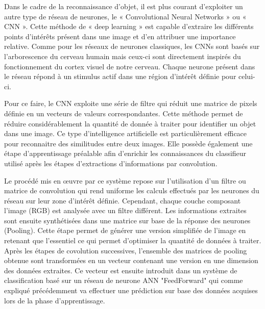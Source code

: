 \documentclass[a4paper,12pt]{article} %
\begin{document}
\newpage
\par
Dans le cadre de la reconnaissance d’objet, il est plus courant d’exploiter un autre type de réseau de neurones, le « Convolutional Neural Networks » ou « CNN ». Cette méthode de « deep learning » est capable d’extraire les différents points d’intérêts présent dans une image et d’en attribuer une importance relative. 
Comme pour les réseaux de neurones classiques, les CNNs sont basés sur l’arborescence du cerveau humain mais ceux-ci sont directement inspirés du fonctionnement du cortex visuel de notre cerveau. Chaque neurone présent dans le réseau répond à un stimulus actif dans une région d’intérêt définie pour celui-ci. \newline
\par
	Pour ce faire, le CNN exploite une série de filtre qui réduit une matrice de pixels définie en un vecteurs de valeurs correspondantes. Cette méthode permet de réduire considérablement la quantité de donnée à traiter pour identifier un objet dans une image. Ce type d’intelligence artificielle est particulièrement efficace pour reconnaitre des similitudes entre deux images. Elle possède également une étape d’apprentissage préalable afin d’enrichir les connaissances du classifieur utilisé après les étapes d’extractions d’informations par convolution. \newline
\par
Le procédé mis en œuvre par ce système repose sur l’utilisation d’un filtre ou matrice de convolution qui rend uniforme les calculs effectués par les neurones du réseau sur leur zone d’intérêt définie. Cependant, chaque couche composant l’image (RGB) est analysée avec un filtre différent. Les informations extraites sont ensuite synthétisées dans une matrice sur base de la réponse des neurones (Pooling). Cette étape permet de générer une version simplifiée de l’image en retenant que l’essentiel ce qui permet d’optimiser la quantité de données à traiter. Après les étapes de covolution successives, l’ensemble des matrices de pooling obtenue sont transformées en un vecteur contenant une version en une dimension des données extraites. Ce vecteur est ensuite introduit dans un système de classification basé sur un réseau de neurone ANN "FeedForward" qui comme expliqué précédemment va effectuer une prédiction sur base des données acquises lors de la phase d’apprentissage. \newline
\end{document}

